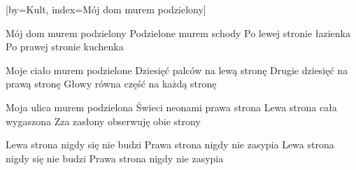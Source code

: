 [by={Kult},
                     index={Mój dom murem podzielony}]
\beginverse

Mój dom murem podzielony
Podzielone murem schody
Po lewej stronie łazienka
Po prawej stronie kuchenka

\endverse
\beginverse

Moje ciało murem podzielone
Dziesięć palców na lewą stronę
Drugie dziesięć na prawą stronę
Głowy równa część na każdą stronę

\endverse
\beginverse

Moja ulica murem podzielona
Świeci neonami prawa strona
Lewa strona cała wygaszona
Zza zasłony obserwuję obie strony

\endverse
\beginverse

Lewa strona nigdy się nie budzi
Prawa strona nigdy nie zasypia
Lewa strona nigdy się nie budzi
Prawa strona nigdy nie zasypia

\endverse
\endsong